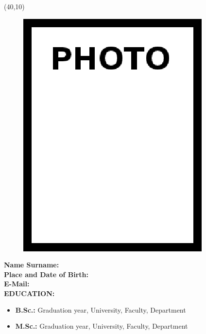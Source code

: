 \vspace{10mm}

\newsavebox{\mysquare}
\savebox{\mysquare}{\textcolor{black}{\rule[2.3pt]{3.4pt}{3.4pt}}}

\setlength{\TPHorizModule}{10pt}
\setlength{\TPVertModule}{10pt}
\begin{textblock}{1}(40,10)
	\begin{figure}[p]
		\includegraphics[scale=0.3,keepaspectratio=true]{./fig/photo}
	\end{figure}
	
\end{textblock}
\textbf{Name Surname:} \\

\vspace{-3mm}
\textbf{Place and Date of Birth:} \\

\vspace{-3mm}
\textbf{E-Mail:} \\


\textbf{EDUCATION:} 
\vspace{-3mm}
\begin{itemize}
	\item \textbf{B.Sc.:} Graduation year, University, Faculty, Department
	\item \textbf{M.Sc.:} Graduation year, University, Faculty, Department
\end{itemize}


